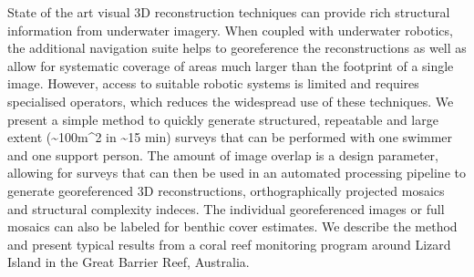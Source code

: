 
State of the art visual 3D reconstruction techniques can provide rich structural information from underwater imagery. When coupled with underwater robotics, the additional navigation suite helps to georeference the reconstructions as well as allow for systematic coverage of areas much larger than the footprint of a single image. However, access to suitable robotic systems is limited and requires specialised operators, which reduces the widespread use of these techniques.
We present a simple method to quickly generate structured, repeatable and large extent (\sim{100m^{2}} in \sim{15 min}) surveys that can be performed with one swimmer and one support person. The amount of image overlap is a design parameter, allowing for surveys that can then be used in an automated processing pipeline to generate georeferenced 3D reconstructions, orthographically projected mosaics and structural complexity indeces. The individual georeferenced images or full mosaics can also be labeled for benthic cover estimates.
We describe the method and present typical results from a coral reef monitoring program around Lizard Island in the Great Barrier Reef, Australia.
  
  